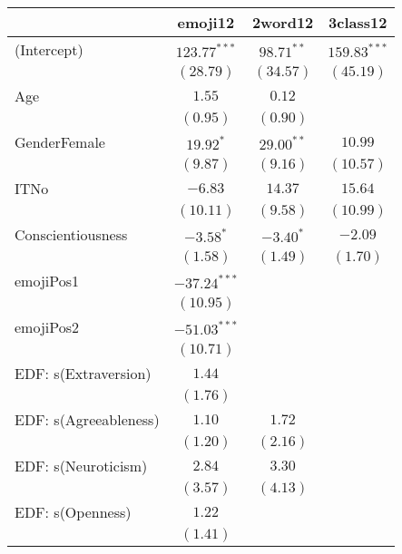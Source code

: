 \small{

\begin{table}
	
\begin{center}
\begin{tabular}{l c c c }
	\hline
	& emoji12 & 2word12 & 3class12 \\
	\hline
	(Intercept)           & $123.77^{***}$ & $98.71^{**}$  & $159.83^{***}$ \\
	& $(28.79)$      & $(34.57)$     & $(45.19)$      \\
	Age                   & $1.55$         & $0.12$        &                \\
	& $(0.95)$       & $(0.90)$      &                \\
	GenderFemale          & $19.92^{*}$    & $29.00^{**}$  & $10.99$        \\
	& $(9.87)$       & $(9.16)$      & $(10.57)$      \\
	ITNo                  & $-6.83$        & $14.37$       & $15.64$        \\
	& $(10.11)$      & $(9.58)$      & $(10.99)$      \\
	Conscientiousness     & $-3.58^{*}$    & $-3.40^{*}$   & $-2.09$        \\
	& $(1.58)$       & $(1.49)$      & $(1.70)$       \\
	emojiPos1             & $-37.24^{***}$ &               &                \\
	& $(10.95)$      &               &                \\
	emojiPos2             & $-51.03^{***}$ &               &                \\
	& $(10.71)$      &               &                \\
	EDF: s(Extraversion)  & $1.44$         &               &                \\
	& $(1.76)$       &               &                \\
	EDF: s(Agreeableness) & $1.10$         & $1.72$        &                \\
	& $(1.20)$       & $(2.16)$      &                \\
	EDF: s(Neuroticism)   & $2.84$         & $3.30$        &                \\
	& $(3.57)$       & $(4.13)$      &                \\
	EDF: s(Openness)      & $1.22$         &               &                \\
	& $(1.41)$       &               &                \\

\end{tabular}
\end{center}
\end{table}}
